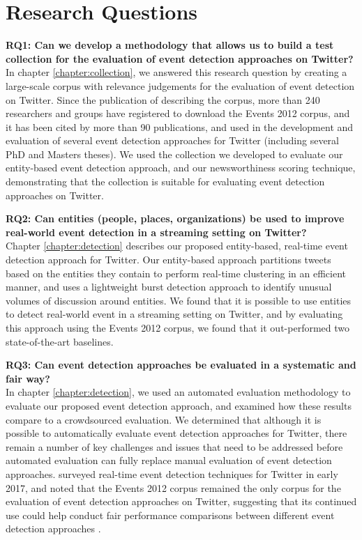 \section{Research Questions}
\textbf{RQ1: Can we develop a methodology that allows us to build a test collection for the evaluation of event detection approaches on Twitter?}\\
In chapter \ref{chapter:collection}, we answered this research question by creating a large-scale corpus with relevance judgements for the evaluation of event detection on Twitter.
Since the publication of \cite{McMinn2013} describing the corpus, more than 240 researchers and groups have registered to download the Events 2012 corpus, and it has been cited by more than 90 publications, and used in the development and evaluation of several event detection approaches for Twitter (including several PhD and Masters theses).
We used the collection we developed to evaluate our entity-based event detection approach, and our newsworthiness scoring technique, demonstrating that the collection is suitable for evaluating event detection approaches on Twitter.

\textbf{RQ2: Can entities (people, places, organizations) be used to improve real-world event detection in a streaming setting on Twitter?} \\
Chapter \ref{chapter:detection} describes our proposed entity-based, real-time event detection approach for Twitter.
Our entity-based approach partitions tweets based on the entities they contain to perform real-time clustering in an efficient manner, and uses a lightweight burst detection approach to identify unusual volumes of discussion around entities.
We found that it is possible to use entities to detect real-world event in a streaming setting on Twitter, and by evaluating this approach using the Events 2012 corpus, we found that it out-performed two state-of-the-art baselines.

\textbf{RQ3: Can event detection approaches be evaluated in a systematic and fair way?} \\
In chapter \ref{chapter:detection}, we used an automated evaluation methodology to evaluate our proposed event detection approach, and examined how these results compare to a crowdsourced evaluation.
We determined that although it is possible to automatically evaluate event detection approaches for Twitter, there remain a number of key challenges and issues that need to be addressed before automated evaluation can fully replace manual evaluation of event detection approaches.
\cite{Hasan17} surveyed real-time event detection techniques for Twitter in early 2017, and noted that the Events 2012 corpus remained the only corpus for the evaluation of event detection approaches on Twitter, suggesting that its continued use could help conduct fair performance comparisons between different event detection approaches \citep{Hasan17}.

